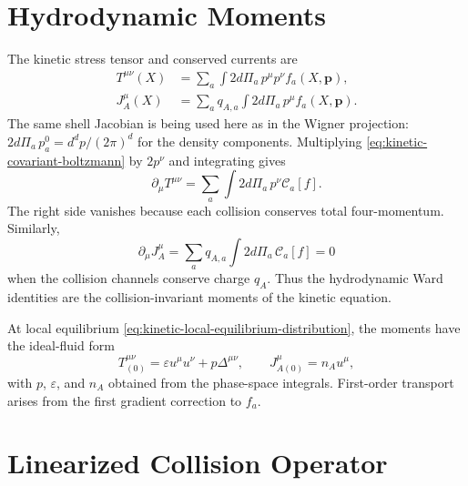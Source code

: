 \section{Hydrodynamic Moments}

The kinetic stress tensor and conserved currents are
\begin{align}
  T^{\mu\nu}(X)
  &=
  \sum_a\int 2d\Pi_a\,p^\mu p^\nu f_a(X,\mathbf p),
  \label{eq:kinetic-stress-tensor}\\
  J^\mu_A(X)
  &=
  \sum_a q_{A,a}\int 2d\Pi_a\,p^\mu f_a(X,\mathbf p).
  \label{eq:kinetic-current}
\end{align}
The same shell Jacobian is being used here as in the Wigner projection:
\(2d\Pi_a\,p_a^0=d^d p/(2\pi)^d\) for the density components.
Multiplying \eqref{eq:kinetic-covariant-boltzmann} by \(2p^\nu\) and
integrating gives
\[
  \partial_\mu T^{\mu\nu}
  =
  \sum_a\int 2d\Pi_a\,p^\nu\mathcal C_a[f].
\]
The right side vanishes because each collision conserves total
four-momentum.  Similarly,
\[
  \partial_\mu J^\mu_A
  =
  \sum_a q_{A,a}\int 2d\Pi_a\,\mathcal C_a[f]=0
\]
when the collision channels conserve charge \(q_A\).  Thus the hydrodynamic
Ward identities are the collision-invariant moments of the kinetic equation.

At local equilibrium \eqref{eq:kinetic-local-equilibrium-distribution}, the
moments have the ideal-fluid form
\[
  T^{\mu\nu}_{(0)}=\varepsilon u^\mu u^\nu+p\Delta^{\mu\nu},
  \qquad
  J^\mu_{A(0)}=n_Au^\mu,
\]
with \(p\), \(\varepsilon\), and \(n_A\) obtained from the phase-space
integrals.  First-order transport arises from the first gradient correction
to \(f_a\).

\section{Linearized Collision Operator}

